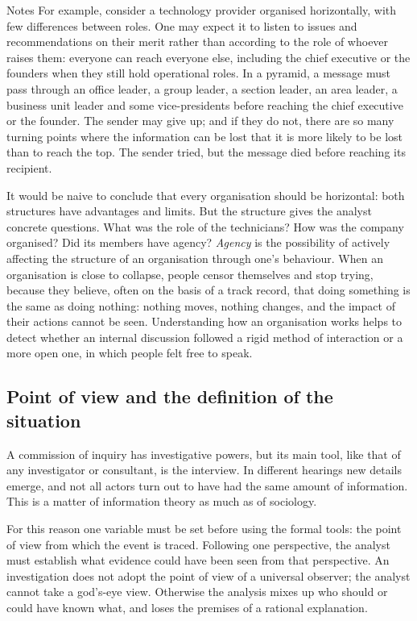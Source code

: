 \begin{nota}{Notes}
	For example, consider a technology provider organised horizontally, with few differences between roles. One may expect it to listen to issues and recommendations on their merit rather than according to the role of whoever raises them: everyone can reach everyone else, including the chief executive or the founders when they still hold operational roles. In a pyramid, a message must pass through an office leader, a group leader, a section leader, an area leader, a business unit leader and some vice-presidents before reaching the chief executive or the founder. The sender may give up; and if they do not, there are so many turning points where the information can be lost that it is more likely to be lost than to reach the top. The sender tried, but the message died before reaching its recipient.
\end{nota}

It would be naive to conclude that every organisation should be horizontal: both structures have advantages and limits. But the structure gives the analyst concrete questions. What was the role of the technicians? How was the company organised? Did its members have agency? \emph{Agency} is the possibility of actively affecting the structure of an organisation through one's behaviour. When an organisation is close to collapse, people censor themselves and stop trying, because they believe, often on the basis of a track record, that doing something is the same as doing nothing: nothing moves, nothing changes, and the impact of their actions cannot be seen. Understanding how an organisation works helps to detect whether an internal discussion followed a rigid method of interaction or a more open one, in which people felt free to speak.

\subsection{Point of view and the definition of the situation}
A commission of inquiry has investigative powers, but its main tool, like that of any investigator or consultant, is the interview. In different hearings new details emerge, and not all actors turn out to have had the same amount of information. This is a matter of information theory as much as of sociology.

For this reason one variable must be set before using the formal tools: the point of view from which the event is traced. Following one perspective, the analyst must establish what evidence could have been seen from that perspective. An investigation does not adopt the point of view of a universal observer; the analyst cannot take a god's-eye view. Otherwise the analysis mixes up who should or could have known what, and loses the premises of a rational explanation.

